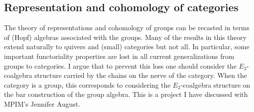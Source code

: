 \documentclass{amsart}
\theoremstyle{definition}
\begin{document}
	\subsection{Representation and cohomology of categories}
	The theory of representations and cohomology of groups can be recasted in terms of (Hopf) algebras associated with the groups. Many of the results in this theory extend naturally to quivers and (small) categories but not all. In particular, some important functoriality properties are lost in all current generalizations from groups to categories.
	I argue that to prevent this loss one should consider the $E_2$-coalgebra structure carried by the chains on the nerve of the category.
	When the category is a group, this corresponds to considering the $E_2$-coalgebra structure on the bar construction of the group algebra.
	This is a project I have discussed with MPIM's Jennifer August.

	
\end{document}

